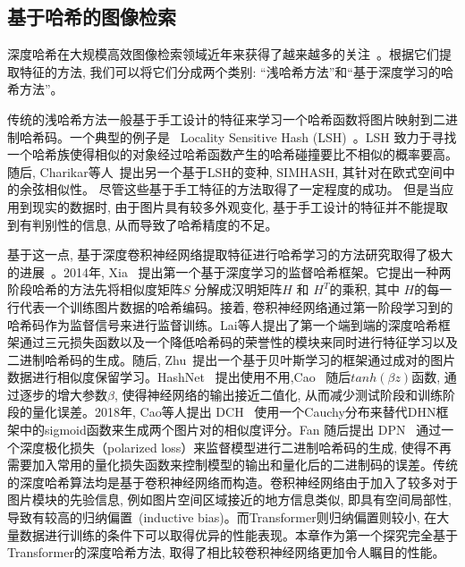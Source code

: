 \subsection{基于哈希的图像检索}
深度哈希在大规模高效图像检索领域近年来获得了越来越多的关注~\cite{chen2021dvhn, ge2013optimized, gong2012iterative, heo2012spherical, indyk1997locality, yu2018product, weiss2008spectral}。根据它们提取特征的方法, 我们可以将它们分成两个类别: ``浅哈希方法''和``基于深度学习的哈希方法''。 \par
传统的浅哈希方法一般基于手工设计的特征来学习一个哈希函数将图片映射到二进制哈希码。一个典型的例子是~ Locality Sensitive Hash (LSH)~\cite{indyk1997locality}。LSH 致力于寻找一个哈希族使得相似的对象经过哈希函数产生的哈希碰撞要比不相似的概率要高。随后, Charikar等人~\cite{charikar2002similarity}提出另一个基于LSH的变种, SIMHASH, 其针对在欧式空间中的余弦相似性。 尽管这些基于手工特征的方法取得了一定程度的成功。 但是当应用到现实的数据时, 由于图片具有较多外观变化, 基于手工设计的特征并不能提取到有判别性的信息, 从而导致了哈希精度的不足。\par
基于这一点, 基于深度卷积神经网络提取特征进行哈希学习的方法研究取得了极大的进展~\cite{cao2017hashnet, fan20deep, li2015feature, liu2016deep, zhu2016deep}。2014年, Xia~\cite{xia2014supervised} 提出第一个基于深度学习的监督哈希框架。它提出一种两阶段哈希的方法先将相似度矩阵$S$ 分解成汉明矩阵$H$ 和 $H^T$的乘积, 其中 $H$的每一行代表一个训练图片数据的哈希编码。接着, 卷积神经网络通过第一阶段学习到的哈希码作为监督信号来进行监督训练。Lai等人提出了第一个端到端的深度哈希框架通过三元损失函数以及一个降低哈希码的荣誉性的模块来同时进行特征学习以及二进制哈希码的生成。随后, Zhu~\cite{liu2016deep}提出一个基于贝叶斯学习的框架通过成对的图片数据进行相似度保留学习。HashNet~\cite{cao2017hashnet} 提出使用不用,Cao~\cite{cao2018deep} 随后$tanh(\beta z)$函数, 通过逐步的增大参数$\beta$, 使得神经网络的输出接近二值化, 从而减少测试阶段和训练阶段的量化误差。2018年, Cao等人提出 DCH~\cite{cao2018deep} 使用一个Cauchy分布来替代DHN框架中的sigmoid函数来生成两个图片对的相似度评分。Fan 随后提出 DPN~\cite{fan2020deep} 通过一个深度极化损失（polarized loss）来监督模型进行二进制哈希码的生成, 使得不再需要加入常用的量化损失函数来控制模型的输出和量化后的二进制码的误差。传统的深度哈希算法均是基于卷积神经网络而构造。卷积神经网络由于加入了较多对于图片模块的先验信息, 例如图片空间区域接近的地方信息类似, 即具有空间局部性, 导致有较高的归纳偏置~(inductive bias)。而Transformer则归纳偏置则较小, 在大量数据进行训练的条件下可以取得优异的性能表现。本章作为第一个探究完全基于Transformer的深度哈希方法, 取得了相比较卷积神经网络更加令人瞩目的性能。

